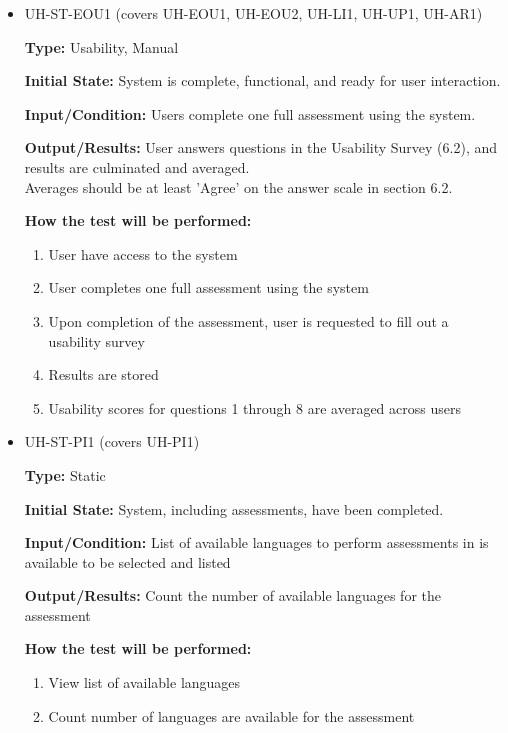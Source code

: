 \documentclass[12pt, titlepage]{article}
\begin{document}
\begin{itemize}
  \item UH-ST-EOU1 (covers UH-EOU1, UH-EOU2, UH-LI1, UH-UP1, UH-AR1)
  \begin{mdframed}[linewidth=0.5mm]
      \textbf{Type:} Usability, Manual\par
      \textbf{Initial State:} System is complete, functional, and ready for user interaction. \par
      \textbf{Input/Condition:} Users complete one full assessment using the system. \par
      \textbf{Output/Results:} User answers questions in the Usability Survey (6.2), and results are culminated and averaged.\\
      Averages should be at least 'Agree' on the answer scale in section 6.2. \par
      \textbf{How the test will be performed:}
      \begin{enumerate}[noitemsep]
        \item User have access to the system
        \item User completes one full assessment using the system
        \item Upon completion of the assessment, user is requested to fill out a usability survey
        \item Results are stored
        \item Usability scores for questions 1 through 8 are averaged across users
      \end{enumerate}
  \end{mdframed}
  \item UH-ST-PI1 (covers UH-PI1)
  \begin{mdframed}[linewidth=0.5mm]
      \textbf{Type:} Static \par
      \textbf{Initial State:} System, including assessments, have been completed. \par
      \textbf{Input/Condition:} List of available languages to perform assessments in is available to be selected and listed\par
      \textbf{Output/Results:} Count the number of available languages for the assessment \par
      \textbf{How the test will be performed:}
      \begin{enumerate}[noitemsep]
        \item View list of available languages
        \item Count number of languages are available for the assessment

\end{enumerate}
\end{mdframed}
\end{itemize}
\end{document}
